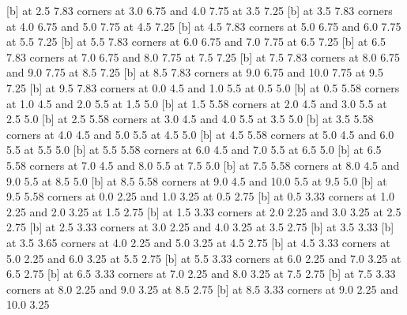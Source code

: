  [b] at 2.5 7.83
\putrectangle corners at 3.0 6.75 and 4.0 7.75
 at 3.5 7.25
 [b] at 3.5 7.83
\putrectangle corners at 4.0 6.75 and 5.0 7.75
 at 4.5 7.25
 [b] at 4.5 7.83
\putrectangle corners at 5.0 6.75 and 6.0 7.75
 at 5.5 7.25
 [b] at 5.5 7.83
\putrectangle corners at 6.0 6.75 and 7.0 7.75
 at 6.5 7.25
 [b] at 6.5 7.83
\putrectangle corners at 7.0 6.75 and 8.0 7.75
 at 7.5 7.25
 [b] at 7.5 7.83
\putrectangle corners at 8.0 6.75 and 9.0 7.75
 at 8.5 7.25
 [b] at 8.5 7.83
\putrectangle corners at 9.0 6.75 and 10.0 7.75
 at 9.5 7.25
 [b] at 9.5 7.83
\putrectangle corners at 0.0 4.5 and 1.0 5.5
 at 0.5 5.0
 [b] at 0.5 5.58
\putrectangle corners at 1.0 4.5 and 2.0 5.5
 at 1.5 5.0
 [b] at 1.5 5.58
\putrectangle corners at 2.0 4.5 and 3.0 5.5
 at 2.5 5.0
 [b] at 2.5 5.58
\putrectangle corners at 3.0 4.5 and 4.0 5.5
 at 3.5 5.0
 [b] at 3.5 5.58
\putrectangle corners at 4.0 4.5 and 5.0 5.5
 at 4.5 5.0
 [b] at 4.5 5.58
\putrectangle corners at 5.0 4.5 and 6.0 5.5
 at 5.5 5.0
 [b] at 5.5 5.58
\putrectangle corners at 6.0 4.5 and 7.0 5.5
 at 6.5 5.0
 [b] at 6.5 5.58
\putrectangle corners at 7.0 4.5 and 8.0 5.5
 at 7.5 5.0
 [b] at 7.5 5.58
\putrectangle corners at 8.0 4.5 and 9.0 5.5
 at 8.5 5.0
 [b] at 8.5 5.58
\putrectangle corners at 9.0 4.5 and 10.0 5.5
 at 9.5 5.0
 [b] at 9.5 5.58
\putrectangle corners at 0.0 2.25 and 1.0 3.25
 at 0.5 2.75
 [b] at 0.5 3.33
\putrectangle corners at 1.0 2.25 and 2.0 3.25
 at 1.5 2.75
 [b] at 1.5 3.33
\putrectangle corners at 2.0 2.25 and 3.0 3.25
 at 2.5 2.75
 [b] at 2.5 3.33
\putrectangle corners at 3.0 2.25 and 4.0 3.25
 at 3.5 2.75
 [b] at 3.5 3.33
 [b] at 3.5 3.65
\putrectangle corners at 4.0 2.25 and 5.0 3.25
 at 4.5 2.75
 [b] at 4.5 3.33
\putrectangle corners at 5.0 2.25 and 6.0 3.25
 at 5.5 2.75
 [b] at 5.5 3.33
\putrectangle corners at 6.0 2.25 and 7.0 3.25
 at 6.5 2.75
 [b] at 6.5 3.33
\putrectangle corners at 7.0 2.25 and 8.0 3.25
 at 7.5 2.75
 [b] at 7.5 3.33
\putrectangle corners at 8.0 2.25 and 9.0 3.25
 at 8.5 2.75
 [b] at 8.5 3.33
\putrectangle corners at 9.0 2.25 and 10.0 3.25
